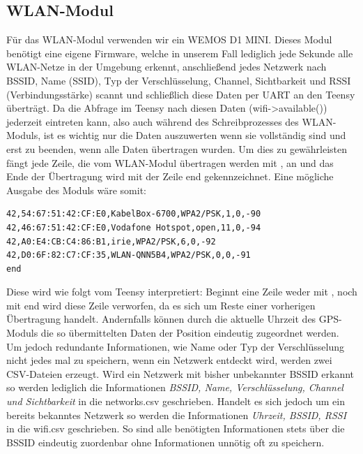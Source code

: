 \documentclass[a4paper,11pt, ngerman]{scrartcl}
\begin{document}
\subsection{WLAN-Modul}
Für das WLAN-Modul verwenden wir ein WEMOS D1 MINI. Dieses Modul benötigt eine eigene Firmware, welche in unserem Fall lediglich jede Sekunde alle WLAN-Netze in der Umgebung erkennt, anschließend jedes Netzwerk nach BSSID, Name (SSID), Typ der Verschlüsselung, Channel, Sichtbarkeit und RSSI (Verbindungsstärke) scannt und schließlich diese Daten per UART an den Teensy überträgt. Da die Abfrage im Teensy nach diesen Daten (wifi->available()) jederzeit eintreten kann, also auch während des Schreibprozesses des WLAN-Moduls, ist es wichtig nur die Daten auszuwerten wenn sie vollständig sind und erst zu beenden, wenn alle Daten übertragen wurden. Um dies zu gewährleisten fängt jede Zeile, die vom WLAN-Modul übertragen werden mit ,\grqq{} an und das Ende der Übertragung wird mit der Zeile \grqq end\grqq{} gekennzeichnet. Eine mögliche Ausgabe des Moduls wäre somit:
\begin{lstlisting}
42,54:67:51:42:CF:E0,KabelBox-6700,WPA2/PSK,1,0,-90
42,46:67:51:42:CF:E0,Vodafone Hotspot,open,11,0,-94
42,A0:E4:CB:C4:86:B1,irie,WPA2/PSK,6,0,-92
42,D0:6F:82:C7:CF:35,WLAN-QNN5B4,WPA2/PSK,0,0,-91
end
\end{lstlisting}
Diese wird wie folgt vom Teensy interpretiert: Beginnt eine Zeile weder mit ,\grqq{} noch mit \grqq end\grqq{} wird diese Zeile verworfen, da es sich um Reste einer vorherigen Übertragung handelt. Andernfalls können durch die aktuelle Uhrzeit des GPS-Moduls die so übermittelten Daten der Position eindeutig zugeordnet werden. Um jedoch redundante Informationen, wie Name oder Typ der Verschlüsselung nicht jedes mal zu speichern, wenn ein Netzwerk entdeckt wird, werden zwei CSV-Dateien erzeugt. Wird ein Netzwerk mit bisher unbekannter BSSID erkannt so werden lediglich die Informationen \textit{BSSID, Name, Verschlüsselung, Channel und Sichtbarkeit} in die \grqq networks.csv\grqq{} geschrieben. Handelt es sich jedoch um ein bereits bekanntes Netzwerk so werden die Informationen \textit{Uhrzeit, BSSID, RSSI} in die \grqq wifi.csv \grqq{} geschrieben. So sind alle benötigten Informationen stets über die BSSID eindeutig zuordenbar ohne Informationen unnötig oft zu speichern.
\end{document}
